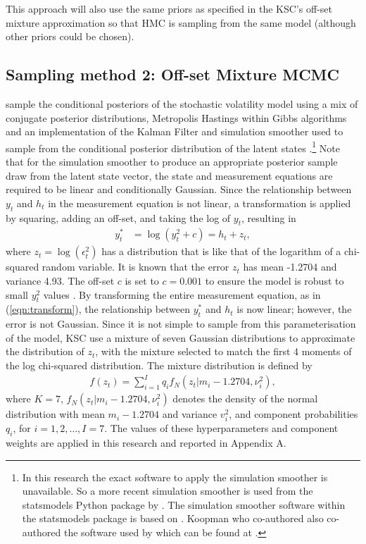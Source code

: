 \documentclass[12pt, a4paper]{article}
\begin{document}
        This approach will also use the same priors as specified in the KSC's off-set mixture approximation so that HMC is sampling from the same model (although other priors could be chosen). 

    
    \subsection{Sampling method 2: Off-set Mixture MCMC}
        \citet{kim1998stochastic} sample the conditional posteriors of the stochastic volatility model using a mix of conjugate posterior distributions, Metropolis Hastings \citep{metropolis1953equation, hastings1970monte} within Gibbs \citep{geman1984stochastic} algorithms and an implementation of the Kalman Filter \citep{kalman1960new} and simulation smoother used to sample from the conditional posterior distribution of the latent states \citep{dejong1995}.\footnote{In this research the exact software to apply the simulation smoother is unavailable. So a more recent simulation smoother is used from the statsmodels Python package by \citet{seabold2010statsmodels}. The simulation smoother software within the statsmodels package is based on \citet{durbin2012time}. Koopman who co-authored \citet{durbin2012time} also co-authored the software used by \citet{kim1998stochastic} which can be found at \citet{koopman1996ssfpack}.} Note that for the simulation smoother to produce an appropriate posterior sample draw from the latent state vector, the state and measurement equations are required to be linear and conditionally Gaussian. Since the relationship between $y_t$ and $h_t$ in the measurement equation is not linear, a transformation is applied by squaring, adding an off-set, and taking the log of $y_t$, resulting in
        \begin{align}
        y_t^{*} &= \log(y_t^2 + c) = h_t + z_t, \label{eqn:transform}
        \end{align}
        where $z_t = \log(\epsilon_t^2)$ has a distribution that is like that of the logarithm of a chi-squared random variable. It is known that the error $z_t$ has mean -1.2704 and variance 4.93. The off-set $c$ is set to $c=0.001$ to ensure the model is robust to small $y_t^2$ values \citep{fuller1996introduction}. By transforming the entire measurement equation, as in (\ref{eqn:transform}), the relationship between $y_t^{*}$ and $h_t$ is now linear; however, the error is not Gaussian. Since it is not simple to sample from this parameterisation of the model, KSC use a mixture of seven Gaussian distributions to approximate the distribution of $z_t$, with the mixture selected to match the first 4 moments of the log chi-squared distribution. The mixture distribution is defined by
        \begin{align}
        f(z_t) = \sum_{i=1}^{I} q_if_N(z_t|m_i-1.2704, \nu_i^2),
        \end{align}
        where $K=7$, $f_N(z_t|m_i-1.2704, \nu_i^2)$ denotes the density of the normal distribution with mean $m_i-1.2704$ and variance $v_i^2$, and  component probabilities $q_i$, for $i=1,2,\ldots, I=7$.  The values of these hyperparameters and component weights are applied in this research and reported in Appendix A.
\end{document}
